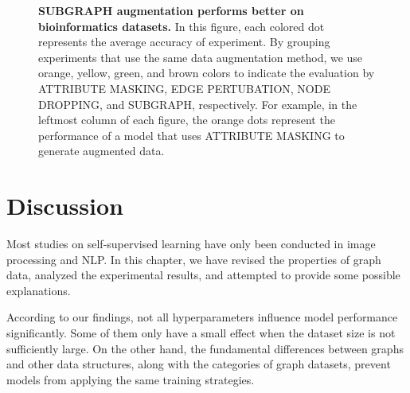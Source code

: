 \begin{figure}
\vspace{0.5cm}
\caption[SUBGRAPH augmentation performs better on bioinformatics datasets]{\textbf{SUBGRAPH augmentation performs better on bioinformatics datasets.} In this figure, each colored dot represents the average accuracy of experiment. By grouping experiments that use the same data augmentation method, we use orange, yellow, green, and brown colors to indicate the evaluation by ATTRIBUTE MASKING, EDGE PERTUBATION, NODE DROPPING, and SUBGRAPH, respectively. For example, in the leftmost column of each figure, the orange dots represent the performance of a model that uses ATTRIBUTE MASKING to generate augmented data.}
\label{fig:stable}
\end{figure}




\section{Discussion}

Most studies on self-supervised learning have only been conducted in image processing and NLP. In this chapter, we have revised the properties of graph data, analyzed the experimental results, and attempted to provide some possible explanations. 

According to our findings, not all hyperparameters influence model performance significantly. Some of them only have a small effect when the dataset size is not sufficiently large. On the other hand, the fundamental differences between graphs and other data structures, along with the categories of graph datasets, prevent models from applying the same training strategies.